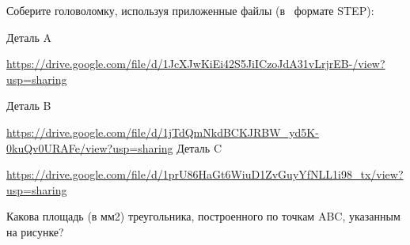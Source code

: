 
Соберите головоломку, используя приложенные файлы (в  формате STEP):

Деталь A

\url{https://drive.google.com/file/d/1JcXJwKiEi42S5JiICzoJdA31vLrjrEB-/view?usp=sharing}

Деталь B

\url{https://drive.google.com/file/d/1jTdQmNkdBCKJRBW_yd5K-0kuQv0URAFe/view?usp=sharing}
Деталь C

\url{https://drive.google.com/file/d/1prU86HaGt6WiuD1ZvGuyYfNLL1i98_tx/view?usp=sharing}


Какова площадь (в мм2) треугольника, построенного по точкам ABC, указанным на рисунке?